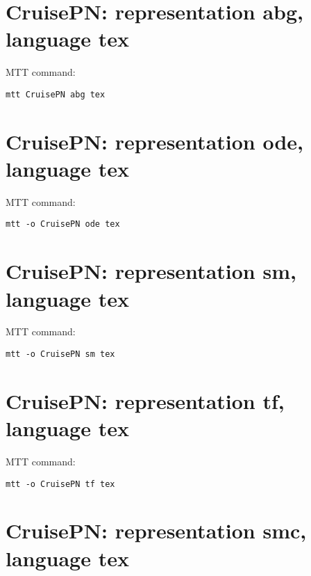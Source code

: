

\section{\textbf{CruisePN}: representation \textbf{abg}, language \textbf{tex}}
\label{sec:CruisePN_abg.tex}


MTT command:
\begin{verbatim}
mtt CruisePN abg tex 
\end{verbatim}
  


\section{\textbf{CruisePN}: representation \textbf{ode}, language \textbf{tex}}
\label{sec:CruisePN_ode.tex}


MTT command:
\begin{verbatim}
mtt -o CruisePN ode tex 
\end{verbatim}
  


\section{\textbf{CruisePN}: representation \textbf{sm}, language \textbf{tex}}
\label{sec:CruisePN_sm.tex}


MTT command:
\begin{verbatim}
mtt -o CruisePN sm tex 
\end{verbatim}
  


\section{\textbf{CruisePN}: representation \textbf{tf}, language \textbf{tex}}
\label{sec:CruisePN_tf.tex}


MTT command:
\begin{verbatim}
mtt -o CruisePN tf tex 
\end{verbatim}
  


\section{\textbf{CruisePN}: representation \textbf{smc}, language \textbf{tex}}
\label{sec:CruisePN_smc.tex}


